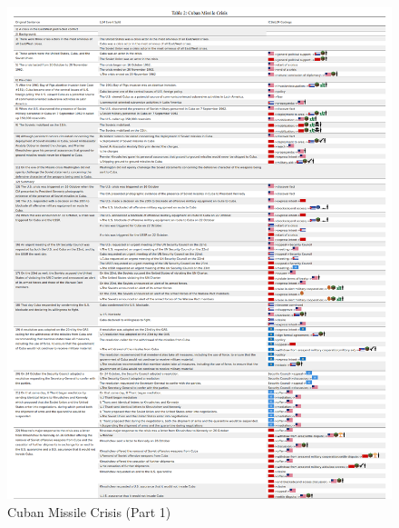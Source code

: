 \documentclass[
]{article}
\begin{document}
\begin{figure}[H]

{\centering \includegraphics{Figure1_Cuban_Missile_Crisis3a.png}

}

\caption{Cuban Missile Crisis (Part 1)}

\end{figure}%

\newpage{}
\end{document}
